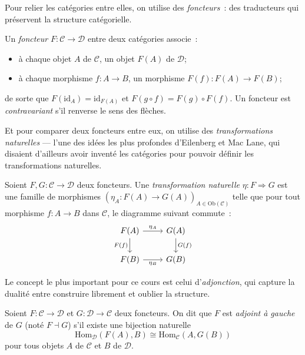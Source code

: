 Pour relier les cat\'egories entre elles, on utilise des \emph{foncteurs}~:
des \og traducteurs\fg{} qui pr\'eservent la structure cat\'egorielle.

\begin{definition}[Foncteur]
Un \emph{foncteur} $F\colon \mathcal{C} \to \mathcal{D}$ entre deux cat\'egories associe~:
\begin{itemize}
  \item \`a chaque objet $A$ de $\mathcal{C}$, un objet $F(A)$ de $\mathcal{D}$;
  \item \`a chaque morphisme $f\colon A \to B$, un morphisme $F(f)\colon F(A) \to F(B)$;
\end{itemize}
de sorte que $F(\mathrm{id}_A) = \mathrm{id}_{F(A)}$ et $F(g \circ f) = F(g) \circ F(f)$.
Un foncteur est \emph{contravariant} s'il renverse le sens des fl\`eches.
\end{definition}

Et pour comparer deux foncteurs entre eux, on utilise des
\emph{transformations naturelles} --- l'une des id\'ees les plus profondes
d'Eilenberg et Mac Lane, qui disaient d'ailleurs avoir invent\'e les
cat\'egories pour pouvoir d\'efinir les transformations naturelles.

\begin{definition}
Soient $F, G\colon \mathcal{C} \to \mathcal{D}$ deux foncteurs. Une \emph{transformation
naturelle} $\eta\colon F \Rightarrow G$ est une famille de morphismes
$(\eta_A\colon F(A) \to G(A))_{A \in \mathrm{Ob}(\mathcal{C})}$ telle que pour tout
morphisme $f\colon A \to B$ dans $\mathcal{C}$, le diagramme suivant commute~:
\[
\begin{tikzcd}
F(A) \arrow[r, "\eta_A"] \arrow[d, "F(f)"'] & G(A) \arrow[d, "G(f)"] \\
F(B) \arrow[r, "\eta_B"'] & G(B)
\end{tikzcd}
\]
\end{definition}

Le concept le plus important pour ce cours est celui d'\emph{adjonction},
qui capture la dualit\'e entre \og construire librement\fg{} et \og oublier la
structure\fg.

\begin{definition}[Adjonction]
Soient $F\colon \mathcal{C} \to \mathcal{D}$ et $G\colon \mathcal{D} \to \mathcal{C}$
deux foncteurs. On dit que $F$ est \emph{adjoint \`a gauche} de $G$ (not\'e $F \dashv G$)
s'il existe une bijection naturelle
\[
  \mathrm{Hom}_{\mathcal{D}}(F(A), B) \cong \mathrm{Hom}_{\mathcal{C}}(A, G(B))
\]
pour tous objets $A$ de $\mathcal{C}$ et $B$ de $\mathcal{D}$.
\end{definition}

